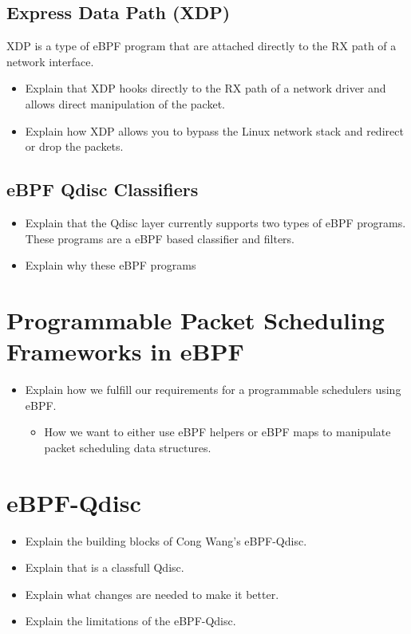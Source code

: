 \documentclass[sigconf, nonacm]{acmart}
\begin{document}
\subsection{Express Data Path (XDP)}

XDP is a type of eBPF program that are attached directly to the RX path of a
network interface.

\begin{itemize}
  \item Explain that XDP hooks directly to the RX path of a network driver and allows direct manipulation of the packet.
  \item Explain how XDP allows you to bypass the Linux network stack and redirect or drop the packets.
\end{itemize}


\subsection{eBPF Qdisc Classifiers}

\begin{itemize}
  \item Explain that the Qdisc layer currently supports two types of eBPF programs. These programs are a eBPF based classifier and filters.
  \item Explain why these eBPF programs
\end{itemize}


\section{Programmable Packet Scheduling Frameworks in eBPF}

\begin{itemize}
  \item Explain how we fulfill our requirements for a programmable schedulers using eBPF.
        \begin{itemize}
          \item How we want to either use eBPF helpers or eBPF maps to manipulate packet scheduling data structures.
        \end{itemize}
\end{itemize}


\section{eBPF-Qdisc}

\begin{itemize}
  \item Explain the building blocks of Cong Wang's eBPF-Qdisc.
  \item Explain that is a classfull Qdisc.
  \item Explain what changes are needed to make it better.
  \item Explain the limitations of the eBPF-Qdisc.
\end{itemize}
\end{document}
